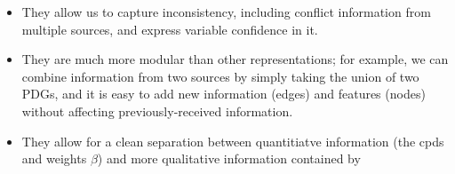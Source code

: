 \documentclass[letterpaper]{article} %
\theoremstyle{plain}
\theoremstyle{definition}
\theoremstyle{remark}
\newcommand{\commentout}[1]{\ignorespaces}
\begin{document}
\begin{itemize}
\item They allow us to capture inconsistency, including conflict information
	from multiple sources, and express variable confidence in
	it.
\item 
	They are much more modular 
	than other representations; for example, we can combine information from two sources by simply taking the union of two
	PDGs, and it is easy to add new information (edges)
	and features (nodes) without affecting previously-received information.
\commentout{
	In contrast to factor graphs, restrictions of PDGs continue to retain the same
	local commitment to the meanings of cpds in the restriction. As a result, PDGs
	exhibit both flexibility and locality, making them uniquely modular. 
}
\item They allow for a clean separation between quantitiatve information (the
	cpds and weights $\beta$) and more qualitative information contained by

\end{itemize}
\end{document}
